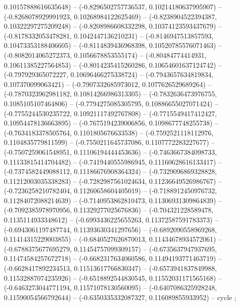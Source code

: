 0.10157888616635648) -- (-0.8296502757736537, 0.10214180637995907) -- (-0.8268078929991923, 0.10268984122625469) -- (-0.8238904522394387, 0.10322297275209248) -- (-0.8208986608332298, 0.10374123593437679) -- (-0.8178332053478281, 0.1042447136210231) -- (-0.8146947513857593, 0.10473353188406605) -- (-0.8114839436968398, 0.10520785576071463) -- (-0.8082014065272373, 0.1056678853555174) -- (-0.80484774414931, 0.10611385227564853) -- (-0.8014235415260286, 0.10654601637124742) -- (-0.797929365072227, 0.10696466275338724) -- (-0.7943657634819834, 0.107370099063421) -- (-0.7907332685973012, 0.1077626529689264) -- (-0.7870323962981182, 0.10814266986313305) -- (-0.7832636473976755, 0.1085105107464806) -- (-0.7794275085305795, 0.10886655027071424) -- (-0.7755244530235722, 0.10921117492767808) -- (-0.7715549417412427, 0.10954478136663895) -- (-0.7675194239006856, 0.1098677748255738) -- (-0.7634183378505764, 0.1101805676633538) -- (-0.7592521118112976, 0.1104835779811599) -- (-0.7550211645737086, 0.1107772283227677) -- (-0.7507259061548951, 0.11106194444453636) -- (-0.7463667384098733, 0.11133815414704482) -- (-0.7419440555986945, 0.11160628616133417) -- (-0.7374582449088112, 0.11186676908364324) -- (-0.7329096869328828, 0.11212003035338283) -- (-0.7282987561024634, 0.11236649526986767) -- (-0.7236258210782404, 0.11260658604405019) -- (-0.7188912450976732, 0.11284072088214639) -- (-0.7140953862810473, 0.11306931309864839) -- (-0.7092385978970956, 0.11329277025676836) -- (-0.704321228589478, 0.1135114933348612) -- (-0.6993436225655263, 0.11372587591783373) -- (-0.6943061197487744, 0.11393630341297656) -- (-0.6892090558969268, 0.11414315229003855) -- (-0.6840527626870013, 0.11434678934572061) -- (-0.6788375677695279, 0.11454757099309157) -- (-0.6735637947937695, 0.11474584257672718) -- (-0.6682317634060586, 0.11494193771463719) -- (-0.6628417892234513, 0.11513617766830347) -- (-0.6573941837849988, 0.11532887074235926) -- (-0.6518892544830545, 0.11552031171565168) -- (-0.6463273044771194, 0.11571078130560095) -- (-0.6407086325928248, 0.11590054566792644) -- (-0.6350335332087327, 0.116089855933952) -- cycle
;
